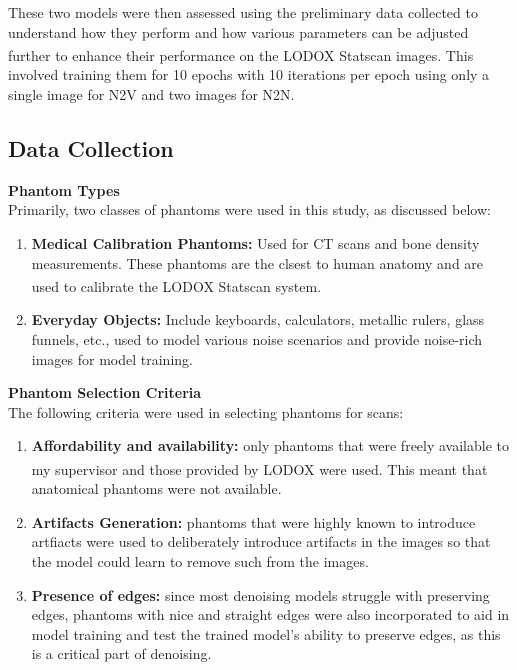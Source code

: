 These two models were then assessed using the preliminary data collected to understand how they perform and how various parameters can be adjusted further to enhance their performance on the LODOX\textsuperscript{\textregistered} Statscan\textsuperscript{\textregistered}
images. This involved training them for 10 epochs with 10 iterations per epoch using only a single image for \gls{N2V} and two images for \gls{N2N}. 

\subsection{Data Collection} \label{sec:datacolelction}
\textbf{Phantom Types} \label{sec:phantom} \\
Primarily, two classes of phantoms were used in this study, as discussed below:
\begin{enumerate}
    \item \textbf{Medical Calibration Phantoms: } Used for \gls{CT} scans and bone density measurements. These phantoms are the clsest to human anatomy and are used to calibrate the LODOX\textsuperscript{\textregistered} Statscan\textsuperscript{\textregistered} system.
    \item \textbf{Everyday Objects:}  Include keyboards, calculators, metallic rulers, glass funnels, etc., used to model various noise scenarios and provide noise-rich images for model training.
\end{enumerate}

\textbf{Phantom Selection Criteria} \\
The following criteria were used in selecting phantoms for scans:
\begin{enumerate}
    \item \textbf{Affordability and availability:} only phantoms that were freely available to my supervisor and those provided by LODOX\textsuperscript{\textregistered} were used. This meant that anatomical phantoms were not available.
    \item \textbf{Artifacts Generation: }phantoms that were highly known to introduce artfiacts were used to deliberately introduce artifacts in the images so that the model could learn to remove such from the images.
    \item \textbf{Presence of edges:} since most denoising models struggle with preserving edges, phantoms with nice and straight edges were also incorporated to aid in model training and test the trained model's ability to preserve edges, as this is a critical part of denoising.
\end{enumerate}

